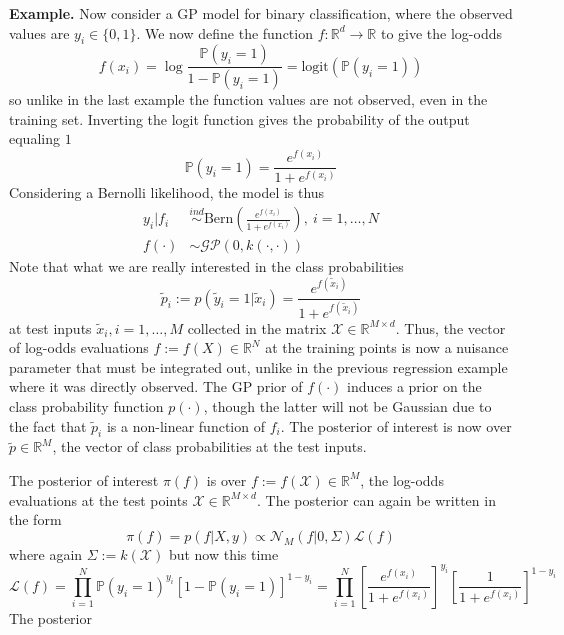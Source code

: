 \documentclass[12pt]{article}
\newcommand{\R}{\mathcal{R}}
\newcommand{\Prob}{\mathbb{P}}
\def\R{\mathbb{R}}
\begin{document}
\bigskip
\noindent
\textbf{Example.} Now consider a GP model for binary classification, where the observed values are $y_i \in \{0, 1\}$. We now define the function $f: \R^d \to \R$ to give the log-odds
\[f(x_i) = \log \frac{\Prob(y_i = 1)}{1 - \Prob(y_i = 1)} = \text{logit}(\Prob(y_i = 1))\]
so unlike in the last example the function values are not observed, even in the training set. Inverting the logit function gives the probability of the output equaling $1$
\[\Prob(y_i = 1) = \frac{e^{f(x_i)}}{1 + e^{f(x_i)}}\]
Considering a Bernolli likelihood, the model is thus
\begin{align*}
y_i|f_i &\overset{ind}{\sim} \text{Bern}\left(\frac{e^{f(x_i)}}{1 + e^{f(x_i)}}\right), \ i = 1, \dots, N \\
f(\cdot) &\sim \mathcal{GP}(0, k(\cdot, \cdot))
\end{align*}
Note that what we are really interested in the class probabilities 
\[\tilde{p}_i := p(\tilde{y}_i = 1|\tilde{x}_i) = \frac{e^{f(\tilde{x}_i)}}{1 + e^{f(\tilde{x}_i)}}\]
at test inputs $\tilde{x}_i, i = 1, \dots, M$ collected in the matrix $\mathcal{X} \in \R^{M \times d}$. Thus, the vector of log-odds evaluations $f := f(X) \in \R^N$ 
at the training points is now a nuisance parameter that must be integrated out, unlike in the previous regression example where it was directly observed. The GP prior of $f(\cdot)$ induces 
a prior on the class probability function $p(\cdot)$, though the latter will not be Gaussian due to the fact that $\tilde{p}_i$ is a non-linear function of $f_i$. The posterior of interest 
is now over $\tilde{p} \in \R^M$, the vector of class probabilities at the test inputs. 



The posterior of interest $\pi(f)$ is over $f := f(\mathcal{X}) \in \R^M$, the log-odds evaluations at the test points $\mathcal{X} \in \R^{M \times d}$. The posterior can again be written in the form
\[\pi(f) = p(f|X, y) \propto \mathcal{N}_M(f|0, \Sigma) \mathcal{L}(f) \]
where again $\Sigma := k(\mathcal{X})$ but now this time
\[\mathcal{L}(f) = \prod_{i = 1}^{N} \Prob(y_i = 1)^{y_i}\left[1 - \Prob(y_i = 1)\right]^{1 - y_i} = \prod_{i = 1}^{N} \left[\frac{e^{f(x_i)}}{1 + e^{f(x_i)}}\right]^{y_i}\left[\frac{1}{1 + e^{f(x_i)}}\right]^{1 - y_i} \]
The posterior 
\end{document}
